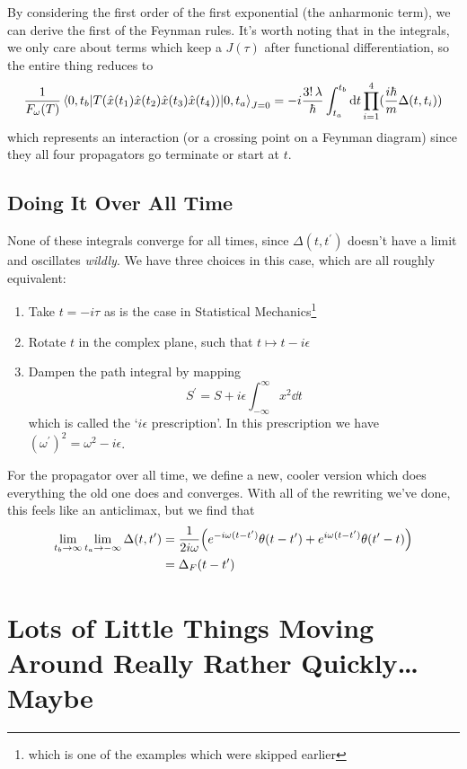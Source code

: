 \documentclass[]{revision-notes}
\begin{document}
By considering the first order of the first exponential (the anharmonic term), we can derive the first of the Feynman rules.
It's worth noting that in the integrals, we only care about terms which keep a \( J(\tau) \) after functional differentiation, so the entire thing reduces to \[\frac{1}{F_\omega(T)} \mel{0, t_b}{T(\hat{x}(t_1) \hat{x}(t_2) \hat{x}(t_3) \hat{x}(t_4)) }{0, t_a}_{J=0} = -i \frac{3!\, \lambda}{\hbar}\int_{t_a}^{t_b} \dd{t} \prod_{i=1}^{4}(\frac{i\hbar}{m}\Delta(t, t_i))\]
which represents an interaction (or a crossing point on a Feynman diagram) since they all four propagators go terminate or start at \(t\).

\section{Doing It Over All Time}
None of these integrals converge for all times, since \(\Delta(t, t^\prime)\) doesn't have a limit and oscillates \emph{wildly}.
We have three choices in this case, which are all roughly equivalent:
\begin{enumerate}
  \item Take \( t = -i\tau \) as is the case in Statistical Mechanics\footnote{which is one of the examples which were skipped earlier}
  \item Rotate \(t\) in the complex plane, such that \( t \mapsto t - i\epsilon \)
  \item Dampen the path integral by mapping \[ S^\prime = S + i\epsilon \int_{-\infty}^\infty x^2 \dd{t} \] which is called the `\(i\epsilon\) prescription'. In this prescription we have \( (\omega^\prime)^2 = \omega^2 - i \epsilon \).
\end{enumerate}

For the propagator over all time, we define a new, cooler version which does everything the old one does and converges.
With all of the rewriting we've done, this feels like an anticlimax, but we find that
\begin{align*}
  \lim_{t_b\to \infty}\lim_{t_a\to -\infty}\Delta(t, t^\prime) &= \frac{1}{2i\omega}\qty(e^{-i\omega(t-t^\prime)} \theta(t-t^\prime) + e^{i\omega(t-t^\prime)} \theta(t^\prime - t))\\
  &= \Delta_F(t- t^\prime)
\end{align*}

\chapter{Lots of Little Things Moving Around Really Rather Quickly\ldots{} Maybe}


\printbibliography
\end{document}
